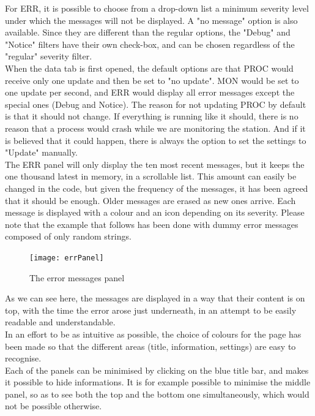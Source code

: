 \documentclass{themeensg}
\begin{document}
For ERR, it is possible to choose from a drop-down list a minimum severity level under which the messages will not be displayed. A "no message" option is also available. Since they are different than the regular options, the "Debug" and "Notice" filters have their own check-box, and can be chosen regardless of the "regular" severity filter.\\

When the data tab is first opened, the default options are that PROC would receive only one update and then be set to "no update". MON would be set to one update per second, and ERR would display all error messages except the special ones (Debug and Notice). The reason for not updating PROC by default is that it should not change. If everything is running like it should, there is no reason that a process would crash while we are monitoring the station. And if it is believed that it could happen, there is always the option to set the settings to "Update" manually.\\

The ERR panel will only display the ten most recent messages, but it keeps the one thousand latest in memory, in a scrollable list. This amount can easily be changed in the code, but given the frequency of the messages, it has been agreed that it should be enough. Older messages are erased as new ones arrive. Each message is displayed with a colour and an icon depending on its severity. Please note that the example that follows has been done with dummy error messages composed of only random strings.\\
\begin{figure}[H]
	\centering
	\texttt{[image: errPanel]}
	\caption{The error messages panel}
\end{figure}
As we can see here, the messages are displayed in a way that their content is on top, with the time the error arose just underneath, in an attempt to be easily readable and understandable.\\


In an effort to be as intuitive as possible, the choice of colours for the page has been made so that the different areas (title, information, settings) are easy to recognise. \\
Each of the panels can be minimised by clicking on the blue title bar, and makes it possible to hide informations. It is for example possible to minimise the middle panel, so as to see both the top and the bottom one simultaneously, which would not be possible otherwise.
\end{document}
